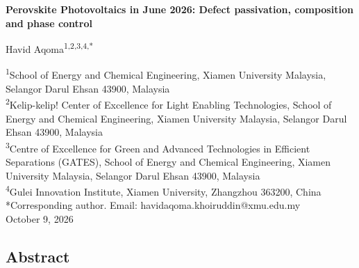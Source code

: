 \documentclass[
  11pt,
]{article}
\author{}
\date{}
\begin{document}
\begin{center}
{\LARGE\bfseries Perovskite Photovoltaics in June 2026: Defect passivation, composition and phase control\par}
\vspace{1.1em}
{\large Havid Aqoma\textsuperscript{1,2,3,4,*}\par}
\vspace{0.7em}
\begin{minipage}{\textwidth}\centering\small
\textsuperscript{1}School of Energy and Chemical Engineering, Xiamen University Malaysia, Selangor Darul Ehsan 43900, Malaysia\\[0.25em]
\textsuperscript{2}Kelip-kelip! Center of Excellence for Light Enabling Technologies, School of Energy and Chemical Engineering, Xiamen University Malaysia, Selangor Darul Ehsan 43900, Malaysia\\[0.25em]
\textsuperscript{3}Centre of Excellence for Green and Advanced Technologies in Efficient Separations (GATES), School of Energy and Chemical Engineering, Xiamen University Malaysia, Selangor Darul Ehsan 43900, Malaysia\\[0.25em]
\textsuperscript{4}Gulei Innovation Institute, Xiamen University, Zhangzhou 363200, China\\[0.55em]
*Corresponding author. Email: havidaqoma.khoiruddin@xmu.edu.my\\[2.0em]
October 9, 2026
\end{minipage}
\end{center}
\vspace{0.8em}

\subsection{Abstract}\label{abstract}
\end{document}

